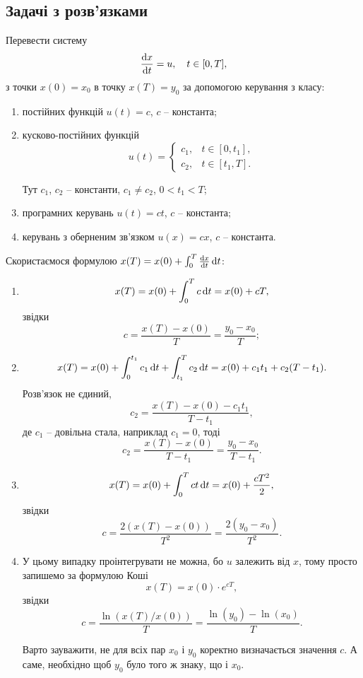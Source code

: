 \subsection{Задачі з розв'язками}

\begin{problem}
	Перевести систему \[ \frac{\mathop{}\!\mathrm{d} x}{\mathop{}\!\mathrm{d} t} = u, \quad t \in [0, T], \] з точки $x (0) = x_0$ в точку $x (T) = y_0$ за допомогою керування з класу:
	\begin{enumerate}
		\item постійних функцій $u (t) = c$, $c$ -- константа;

		\item кусково-постійних функцій \[ u (t) = \begin{cases} c_1, & t \in [0, t_1], \\ c_2, & t \in [t_1, T]. \end{cases} \]

		Тут $c_1$, $c_2$ -- константи, $c_1 \ne c_2$, $0 < t_1 < T$;

		\item програмних керувань $u(t) = c t$, $c$ -- константа;

		\item керувань з оберненим зв'язком $u(x) = c x$, $c$ -- константа.
	\end{enumerate}
\end{problem}

\begin{solution}
	Скористаємося формулою $x (T) = x (0) + \int_0^T \frac{\mathop{}\!\mathrm{d} x}{\mathop{}\!\mathrm{d} t} \mathop{}\!\mathrm{d} t$:

	\begin{enumerate}
		\item \[x (T) = x (0) + \int_0^T c \mathop{}\!\mathrm{d} t = x (0) + c T,\] звідки \[c = \frac{x (T) - x (0)}{T} = \frac{y_0 - x_0}{T};\]

		\item \[ x (T) = x (0) + \int_0^{t_1} c_1 \mathop{}\!\mathrm{d} t + \int_{t_1}^T c_2 \mathop{}\!\mathrm{d} t = x (0) + c_1 t_1 + c_2 (T - t_1). \] Розв'язок не єдиний, \[ c_2 = \frac{x (T) - x (0) - c_1 t_1}{T - t_1}, \] де $c_1$ -- довільна стала, наприклад $c_1 = 0$, тоді \[ c_2 = \frac{x (T) - x (0)}{T - t_1} = \frac{y_0 - x_0}{T - t_1}. \]

		\item \[ x (T) = x (0) + \int_0^T c t \mathop{}\!\mathrm{d} t = x (0) + \frac{cT^2}{2}, \] звідки \[ c = \frac{2 (x (T) - x (0))}{T^2} = \frac{2 (y_0 - x_0)}{T^2}. \]

		\item У цьому випадку проінтегрувати не можна, бо $u$ залежить від $x$, тому просто запишемо за формулою Коші \[ x (T) = x (0) \cdot e^{c T}, \] звідки \[c = \frac{\ln(x (T) / x (0))}{T} = \frac{\ln(y_0) - \ln(x_0)}{T}. \]

		Варто зауважити, не для всіх пар $x_0$ і $y_0$ коректно визначається значення $c$. А саме, необхідно щоб $y_0$ було того ж знаку, що і $x_0$.
	\end{enumerate}
\end{solution}

